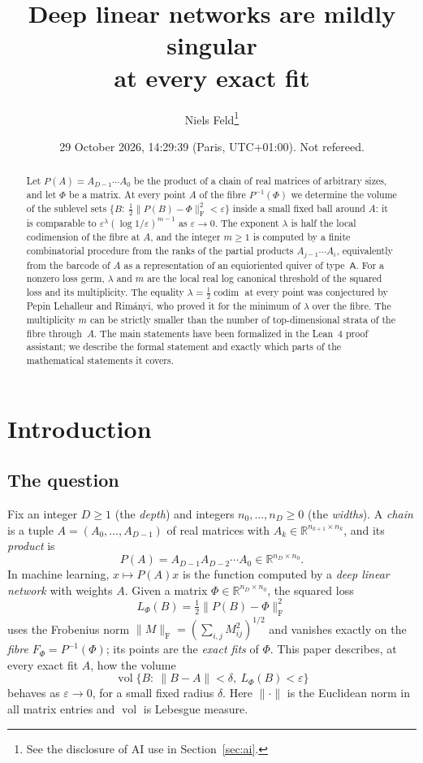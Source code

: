 \documentclass[11pt,a4paper]{article}
\theoremstyle{definition}
\theoremstyle{remark}
\numberwithin{equation}{section}
\newcommand{\R}{\mathbb{R}}
\newcommand{\codim}{\operatorname{codim}}
\newcommand{\vol}{\operatorname{vol}}
\newcommand{\Fr}[1]{\lVert #1\rVert_{\mathrm F}}
\newcommand{\norm}[1]{\lVert #1\rVert}
\newcommand{\eps}{\varepsilon}
\begin{document}
\title{Deep linear networks are mildly singular\\ at every exact fit}
\author{Niels Feld\thanks{See the disclosure of AI use in Section~\ref{sec:ai}.}}
\date{29 October 2026, 14:29:39 (Paris, UTC+01:00). Not refereed.}

\maketitle
\begin{abstract}
Let $P(A)=A_{D-1}\cdots A_0$ be the product of a chain of real matrices of arbitrary sizes, and let $\Phi$ be a matrix. At every point $A$ of the fibre $P^{-1}(\Phi)$ we determine the volume of the sublevel sets $\{B:\ \tfrac12\Fr{P(B)-\Phi}^2<\eps\}$ inside a small fixed ball around $A$: it is comparable to $\eps^{\lambda}(\log 1/\eps)^{m-1}$ as $\eps\to0$. The exponent $\lambda$ is half the local codimension of the fibre at $A$, and the integer $m\ge1$ is computed by a finite combinatorial procedure from the ranks of the partial products $A_{j-1}\cdots A_i$, equivalently from the barcode of $A$ as a representation of an equioriented quiver of type~$\mathsf A$. For a nonzero loss germ, $\lambda$ and $m$ are the local real log canonical threshold of the squared loss and its multiplicity. The equality $\lambda=\tfrac12\codim$ at every point was conjectured by Pepin Lehalleur and Rimányi, who proved it for the minimum of $\lambda$ over the fibre. The multiplicity $m$ can be strictly smaller than the number of top-dimensional strata of the fibre through~$A$. The main statements have been formalized in the Lean~4 proof assistant; we describe the formal statement and exactly which parts of the mathematical statements it covers.
\end{abstract}

\setcounter{tocdepth}{2}
\tableofcontents
\section{Introduction}\label{sec:intro}

\subsection{The question}
Fix an integer $D\ge1$ (the \emph{depth}) and integers $n_0,\dots,n_D\ge0$ (the \emph{widths}). A \emph{chain} is a tuple $A=(A_0,\dots,A_{D-1})$ of real matrices with $A_k\in\R^{n_{k+1}\times n_k}$, and its \emph{product} is
\[
P(A)=A_{D-1}A_{D-2}\cdots A_0\in\R^{n_D\times n_0}.
\]
In machine learning, $x\mapsto P(A)x$ is the function computed by a \emph{deep linear network} with weights $A$. Given a matrix $\Phi\in\R^{n_D\times n_0}$, the squared loss
\[
L_\Phi(B)=\tfrac12\Fr{P(B)-\Phi}^2
\]
uses the Frobenius norm $\Fr M=(\sum_{i,j}M_{ij}^2)^{1/2}$ and vanishes exactly on the \emph{fibre} $F_\Phi=P^{-1}(\Phi)$; its points are the \emph{exact fits} of $\Phi$. This paper describes, at every exact fit $A$, how the volume
\[
\vol\{B:\ \norm{B-A}<\delta,\ L_\Phi(B)<\eps\}
\]
behaves as $\eps\to0$, for a small fixed radius $\delta$. Here $\norm\cdot$ is the Euclidean norm in all matrix entries and $\vol$ is Lebesgue measure.
\end{document}
